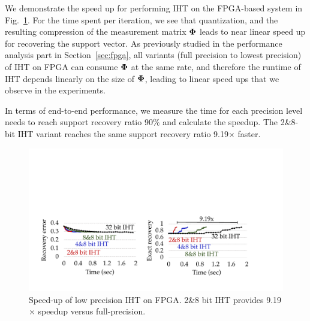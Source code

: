 \documentclass{article}
\begin{document}
We demonstrate the speed up for performing IHT on the FPGA-based system in Fig.~\ref{fig:fpga_time}. For the time spent per iteration, we see that quantization, and the resulting compression of the measurement matrix ${\bf \Phi}$ leads to near linear speed up for recovering the support vector. As previously studied in the performance analysis part in Section~\ref{sec:fpga}, all variants (full precision to lowest precision) of IHT on FPGA can consume ${\bf \Phi}$ at the same rate, and therefore the runtime of IHT depends linearly on the size of ${\bf \Phi}$, leading to linear speed ups that we observe in the experiments.

In terms of end-to-end performance, we measure the time for
each precision level needs to reach support recovery
ratio 90\% and calculate the speedup. The 2\&8-bit IHT variant reaches the same support recovery
ratio 9.19$\times$ faster.




\begin{figure}[t!]
\centering
\includegraphics[width=0.76\columnwidth, angle=0]{figs/fpga_k.pdf}
\caption{Speed-up of low precision IHT on FPGA. 2\&8 bit IHT provides 9.19$\times$ speedup versus full-precision.}
\label{fig:fpga_time}
\end{figure}
\vspace{-1em}
\end{document}
